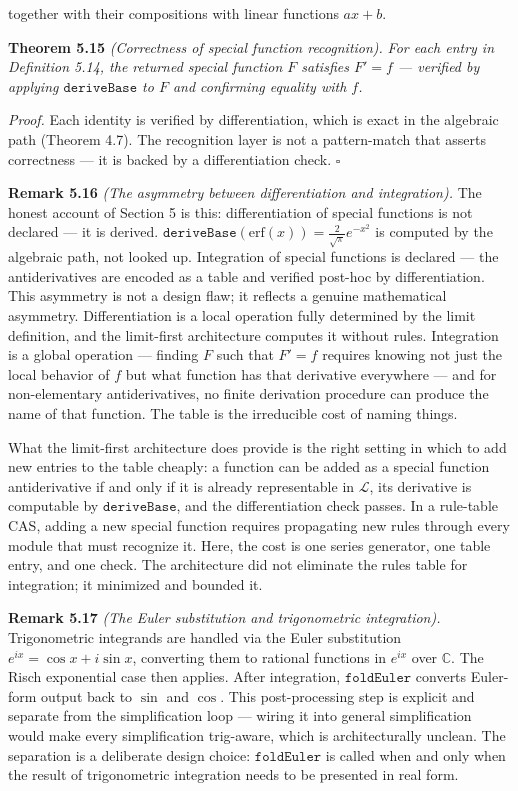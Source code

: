 \documentclass[12pt]{article}
\begin{document}
together with their compositions with linear functions \(ax + b\).

\textbf{Theorem 5.15} \emph{(Correctness of special function
recognition).} \emph{For each entry in Definition 5.14, the returned
special function \(F\) satisfies \(F' = f\) --- verified by applying
\(\mathtt{deriveBase}\) to \(F\) and confirming equality with \(f\).}

\emph{Proof.} Each identity is verified by differentiation, which is
exact in the algebraic path (Theorem 4.7). The recognition layer is not
a pattern-match that asserts correctness --- it is backed by a
differentiation check. \(\square\)

\textbf{Remark 5.16} \emph{(The asymmetry between differentiation and
integration).} The honest account of Section 5 is this: differentiation
of special functions is not declared --- it is derived.
\(\mathtt{deriveBase}(\mathrm{erf}(x)) = \frac{2}{\sqrt{\pi}}e^{-x^2}\)
is computed by the algebraic path, not looked up. Integration of special
functions is declared --- the antiderivatives are encoded as a table and
verified post-hoc by differentiation. This asymmetry is not a design
flaw; it reflects a genuine mathematical asymmetry. Differentiation is a
local operation fully determined by the limit definition, and the
limit-first architecture computes it without rules. Integration is a
global operation --- finding \(F\) such that \(F' = f\) requires knowing
not just the local behavior of \(f\) but what function has that
derivative everywhere --- and for non-elementary antiderivatives, no
finite derivation procedure can produce the name of that function. The
table is the irreducible cost of naming things.

What the limit-first architecture does provide is the right setting in
which to add new entries to the table cheaply: a function can be added
as a special function antiderivative if and only if it is already
representable in \(\mathcal{L}\), its derivative is computable by
\(\mathtt{deriveBase}\), and the differentiation check passes. In a
rule-table CAS, adding a new special function requires propagating new
rules through every module that must recognize it. Here, the cost is one
series generator, one table entry, and one check. The architecture did
not eliminate the rules table for integration; it minimized and bounded
it.

\textbf{Remark 5.17} \emph{(The Euler substitution and trigonometric
integration).} Trigonometric integrands are handled via the Euler
substitution \(e^{ix} = \cos x + i \sin x\), converting them to rational
functions in \(e^{ix}\) over \(\mathbb{C}\). The Risch exponential case
then applies. After integration, \(\mathtt{foldEuler}\) converts
Euler-form output back to \(\sin\) and \(\cos\). This post-processing
step is explicit and separate from the simplification loop --- wiring it
into general simplification would make every simplification trig-aware,
which is architecturally unclean. The separation is a deliberate design
choice: \(\mathtt{foldEuler}\) is called when and only when the result
of trigonometric integration needs to be presented in real form.
\end{document}
